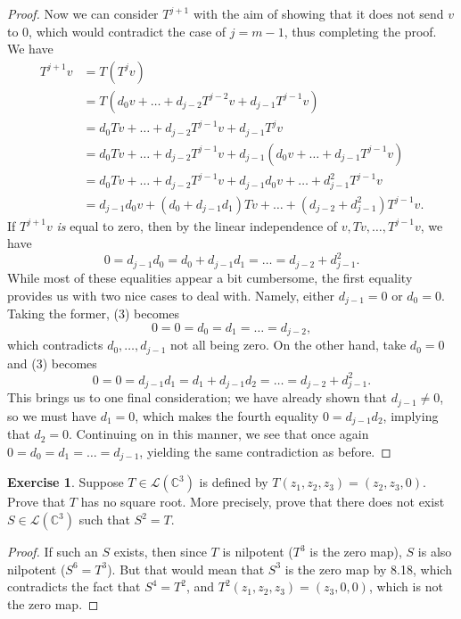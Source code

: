 \documentclass{article}
\theoremstyle{definition}
\newtheorem{ex}{Exercise}
\begin{document}
\begin{proof}
  Now we can consider $T^{j + 1}$ with the aim of showing that it does not send $v$ to 0, which would contradict the case of $j = m - 1$, thus completing the proof.
  We have \begin{align*}
    T^{j + 1}v &= T(T^j v)\\
    &= T(d_0 v + \dots + d_{j - 2}T^{j -2}v + d_{j - 1}T^{j -1}v)\\
    &= d_0 Tv + \dots + d_{j - 2}T^{j -1}v + d_{j - 1}T^j v\\
    &= d_0 Tv + \dots + d_{j - 2}T^{j -1}v + d_{j - 1}(d_0 v + \dots + d_{j - 1}T^{j - 1}v)\\
    &= d_0 Tv + \dots + d_{j-2}T^{j - 1}v + d_{j - 1}d_0 v + \dots + d_{j - 1}^2 T^{j - 1}v\\
    &= d_{j - 1}d_0 v + (d_0 + d_{j - 1}d_1) Tv + \dots + (d_{j - 2} + d_{j - 1}^2)T^{j - 1}v.
  \end{align*}
  If $T^{j + 1} v$ \textit{is} equal to zero, then by the linear independence of $v, Tv, \dots, T^{j-1}v$, we have \begin{equation}
    0 = d_{j - 1}d_0 = d_0 + d_{j-1}d_1 = \dots = d_{j - 2} + d^2_{j-1}.
  \end{equation}
  While most of these equalities appear a bit cumbersome, the first equality provides us with two nice cases to deal with.
  Namely, either $d_{j-1} = 0$ or $d_0 = 0$.
  Taking the former, (3) becomes \begin{equation*}
    0 = 0 = d_0 = d_1 = \dots = d_{j - 2},
  \end{equation*}
  which contradicts $d_0, \dots, d_{j - 1}$ not all being zero.
  On the other hand, take $d_0 = 0$ and (3) becomes \begin{equation*}
    0 = 0 = d_{j - 1}d_1 = d_1 + d_{j - 1}d_2 = \dots = d_{j - 2} + d_{j - 1}^2.
  \end{equation*}
  This brings us to one final consideration; we have already shown that $d_{j - 1} \neq 0$, so we must have $d_1 = 0$, which makes the fourth equality $0 = d_{j - 1}d_2$, implying that $d_2 = 0$.
  Continuing on in this manner, we see that once again $0 = d_0 = d_1 = \dots = d_{j - 1}$, yielding the same contradiction as before.
\end{proof}

\begin{ex}
  Suppose $T \in \mathcal{L}(\mathbb{C}^3)$ is defined by $T(z_1, z_2, z_3) = (z_2, z_3, 0)$. Prove that $T$ has no square root. More precisely, prove that there does not exist $S \in \mathcal{L}(\mathbb{C}^3)$ such that $S^2 = T$.
\end{ex}
\begin{proof}
  If such an $S$ exists, then since $T$ is nilpotent ($T^3$ is the zero map), $S$ is also nilpotent ($S^6 = T^3$). But that would mean that $S^3$ is the zero map by 8.18, which contradicts the fact that $S^4 = T^2$, and $T^2(z_1, z_2, z_3) = (z_3, 0, 0)$, which is not the zero map.
\end{proof}
\end{document}
